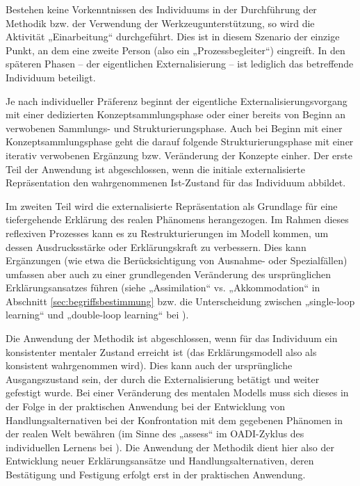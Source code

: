 Bestehen keine Vorkenntnissen des Individuums in der Durchführung der Methodik bzw. der Verwendung der Werkzeugunterstützung, so wird die Aktivität „Einarbeitung“ durchgeführt. Dies ist in diesem Szenario der einzige Punkt, an dem eine zweite Person (also ein „Prozessbegleiter“) eingreift. In den späteren Phasen -- der eigentlichen Externalisierung -- ist lediglich das betreffende Individuum beteiligt.

Je nach individueller Präferenz beginnt der eigentliche Externalisierungsvorgang mit einer dedizierten Konzeptsammlungsphase oder einer bereits von Beginn an verwobenen Sammlungs- und Strukturierungsphase. Auch bei Beginn mit einer Konzeptsammlungsphase geht die darauf folgende Strukturierungsphase mit einer iterativ verwobenen Ergänzung bzw. Veränderung der Konzepte einher. Der erste Teil der Anwendung ist abgeschlossen, wenn die initiale externalisierte Repräsentation den wahrgenommenen Ist-Zustand für das Individuum abbildet.

Im zweiten Teil wird die externalisierte Repräsentation als Grundlage für eine tiefergehende Erklärung des realen Phänomens herangezogen. Im Rahmen dieses reflexiven Prozesses kann es zu Restrukturierungen im Modell kommen, um dessen Ausdrucksstärke oder Erklärungskraft zu verbessern. Dies kann Ergänzungen (wie etwa die Berücksichtigung von Ausnahme- oder Spezialfällen) umfassen aber auch zu einer grundlegenden Veränderung des ursprünglichen Erklärungsansatzes führen (siehe „Assimilation“ vs. „Akkommodation“ in Abschnitt \ref{sec:begriffsbestimmung} bzw. die Unterscheidung zwischen „single-loop learning“ und „double-loop learning“ bei \citet{Argyris76}).

Die Anwendung der Methodik ist abgeschlossen, wenn für das Individuum ein konsistenter mentaler Zustand erreicht ist (das Erklärungsmodell also als konsistent wahrgenommen wird). Dies kann auch der ursprüngliche Ausgangszustand sein, der durch die Externalisierung betätigt und weiter gefestigt wurde. Bei einer Veränderung des mentalen Modells muss sich dieses in der Folge in der praktischen Anwendung bei der Entwicklung von Handlungsalternativen bei der Konfrontation mit dem gegebenen Phänomen in der realen Welt bewähren (im Sinne des „assess“ im \gls{OADI}-Zyklus des individuellen Lernens bei \citet{Kim93}). Die Anwendung der Methodik dient hier also der Entwicklung neuer Erklärungsansätze und Handlungsalternativen, deren Bestätigung und Festigung erfolgt erst in der praktischen Anwendung.


